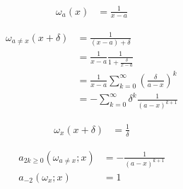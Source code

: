 \documentclass[a4paper,10pt,fleqn]{scrartcl}
\begin{document}
    \begin{align*}
        \omega_a(x) &= \frac1{x-a}
    \end{align*}

    \begin{align*}
        \omega_{a\neq x}(x+\delta)
        &=
        \frac1{(x-a)+\delta}
        \\
        &=
        \frac1{x-a}
        \frac1{1+\frac{\delta}{x-a}}
        \\
        &=
        \frac1{x-a}
        \sum\limits_{k=0}^\infty
        \left(\frac{\delta}{a-x}\right)^k
        \\
        &=
        -
        \sum\limits_{k=0}^\infty
        \delta^k
        \frac{1}{(a-x)^{k+1}}
    \end{align*}

    \begin{align*}
        \omega_x(x+\delta)
        &=
        \frac1{\delta}
    \end{align*}

    \begin{align*}
        a_{2k\geq0}(\omega_{a\neq x};x) &= -\frac{1}{(a-x)^{k+1}}
        \\
        a_{-2}(\omega_x;x) &= 1
    \end{align*}
\end{document}
